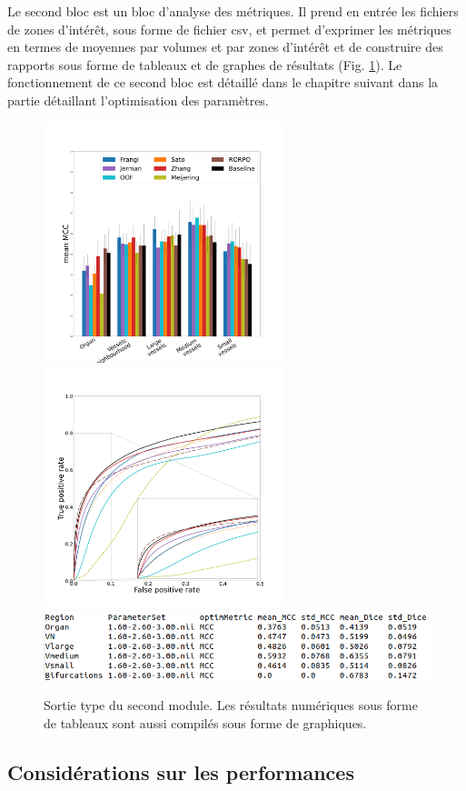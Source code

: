 Le second bloc est un bloc d'analyse des métriques. Il prend en entrée les fichiers de zones d'intérêt, sous forme de fichier csv, et permet d'exprimer les métriques en termes de moyennes par volumes et par zones d'intérêt et de construire des rapports sous forme de tableaux et de graphes de résultats (Fig. \ref{fig:bench_module2}). Le fonctionnement de ce second bloc est détaillé dans le chapitre suivant dans la partie détaillant l'optimisation des paramètres. 
\begin{figure}[!ht]
  \centering
  \includegraphics[height=7cm]{Images/bench_Ircad_PS_MCC.pdf}
  \includegraphics[height=7cm]{Images/bench_Ircad_ROC.pdf}
  \includegraphics[width=\textwidth]{Images/bench_type_of_results.png}
  \caption{Sortie type du second module. Les résultats numériques sous forme de tableaux sont aussi compilés sous forme de graphiques.}
  \label{fig:bench_module2}
\end{figure}
\subsection{Considérations sur les performances}
\label{sec:perf_bench}

